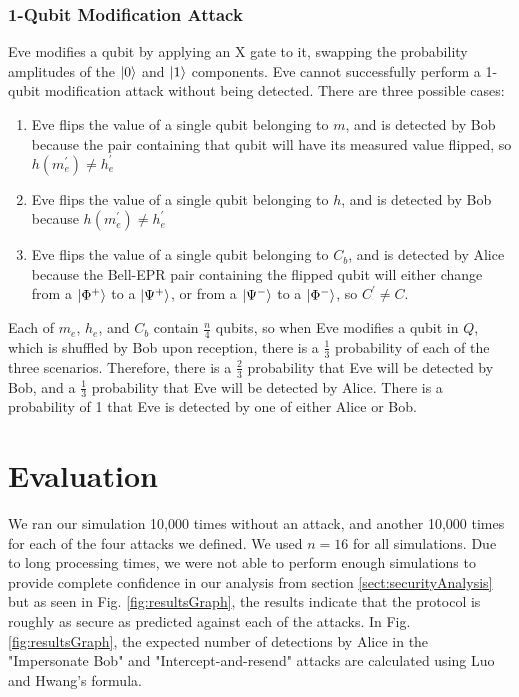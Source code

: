\documentclass[conference,compsoc]{IEEEtran}
\begin{document}
\subsubsection{1-Qubit Modification Attack}

Eve modifies a qubit by applying an X gate to it,
swapping the probability amplitudes of the $\ket{0}$ and $\ket{1}$ components.
Eve cannot successfully perform a 1-qubit modification
attack without being detected. There are three possible cases:
\begin{enumerate}
    \item Eve flips the value of a single qubit belonging to $m$, and is detected by Bob because
    the pair containing that qubit will have its measured value flipped, so
    $h\left(m_{e}^{\prime}\right)\neq h_{e}^{\prime}$
    \item Eve flips the value of a single qubit belonging to $h$, and is detected by Bob because
    $h\left(m_{e}^{\prime}\right)\neq h_{e}^{\prime}$
    \item Eve flips the value of a single qubit belonging to $C_{b}$, and is detected by Alice because
    the Bell-EPR pair containing the flipped qubit will either change from a
    $\ket{\Phi^+}$ to a $\ket{\Psi^+}$, or from a $\ket{\Psi^-}$ to a $\ket{\Phi^-}$, so $C^{\prime} \neq C$.
\end{enumerate}

Each of $m_e$, $h_e$, and $C_b$ contain $\frac{n}{4}$ qubits, so when Eve modifies a qubit in $Q$,
which is shuffled by Bob upon reception, there is a $\frac{1}{3}$ probability of each of the three
scenarios. Therefore, there is a $\frac{2}{3}$ probability that Eve will be detected by Bob, and a
$\frac{1}{3}$ probability that Eve will be detected by Alice. There is a probability of 1 that Eve
is detected by one of either Alice or Bob.

\section{Evaluation}

We ran our simulation 10,000 times without an attack, and another 10,000 times for
each of the four attacks we defined. We used $n=16$ for all simulations.
Due to long processing times, we were not able to perform enough simulations to provide complete
confidence in our analysis from section \ref{sect:securityAnalysis} but as seen in
Fig. \ref{fig:resultsGraph}, the results indicate that the protocol is roughly as secure
as predicted against each of the attacks. In Fig. \ref{fig:resultsGraph}, the expected number
of detections by Alice in the "Impersonate Bob" and "Intercept-and-resend" attacks are calculated
using Luo and Hwang's formula.
\end{document}
